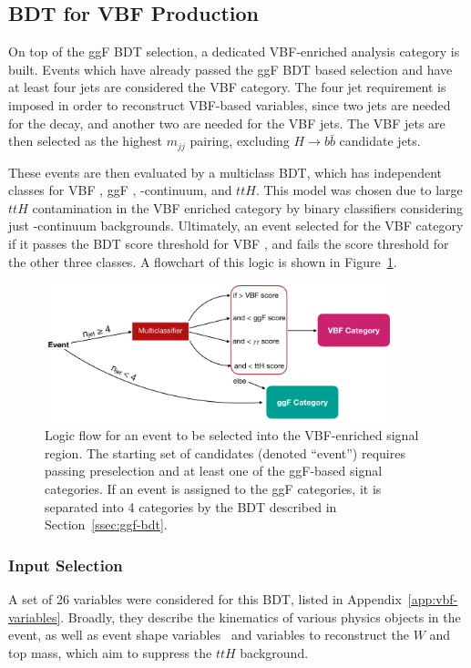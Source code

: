 \subsection{BDT for VBF Production}\label{ssec:vbf-bdt}
On top of the ggF \gls{BDT} selection, a dedicated VBF-enriched analysis category is built. Events which have already passed the ggF BDT based selection and have at least four jets are considered the VBF category. The four jet requirement is imposed in order to reconstruct VBF-based variables, since two jets are needed for the \Hbb decay, and another two are needed for the VBF jets. The VBF jets are then selected as the highest $m_{jj}$ pairing, excluding $H\rightarrow b\bar{b}$ candidate jets.

These events are then evaluated by a multiclass BDT, which has independent classes for VBF \HH, ggF \HH, \yy-continuum, and $ttH$. This model was chosen due to large $ttH$ contamination in the VBF enriched category by binary classifiers considering just \yy-continuum backgrounds. Ultimately, an event selected for the VBF category if it passes the BDT score threshold for VBF \HH, and fails the score threshold for the other three classes. A flowchart of this logic is shown in Figure~\ref{fig:vbf-logic}.

\begin{figure}[htbp]
    \centering
	\includegraphics[width=0.9\textwidth]{chapters/chapter6_vbf/images/vbf_logic.png}
    \caption[Logic flow for an event to be selected into the VBF-enriched signal region]{Logic flow for an event to be selected into the VBF-enriched signal region. The starting set of candidates (denoted ``event'') requires passing preselection and at least one of the ggF-based signal categories. If an event is assigned to the ggF categories, it is separated into 4 categories by the \gls{BDT} described in Section~\ref{ssec:ggf-bdt}.}
    \label{fig:vbf-logic}
\end{figure}

\subsubsection{Input Selection}
A set of 26 variables were considered for this BDT, listed in Appendix~\ref{app:vbf-variables}. Broadly, they describe the kinematics of various physics objects in the event, as well as event shape variables~\cite{STDM-2011-33} and variables to reconstruct the $W$ and top mass, which aim to suppress the $ttH$ background.

